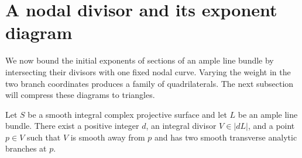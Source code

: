 \section{A nodal divisor and its exponent diagram}
\label{sec:node}

We now bound the initial exponents of sections of an ample line bundle by
intersecting their divisors with one fixed nodal curve.  Varying the weight
in the two branch coordinates produces a family of quadrilaterals.  The
next subsection will compress these diagrams to triangles.

\begin{lemma}
\label{lem:node}
Let $S$ be a smooth integral complex projective surface and let $L$ be an
ample line bundle.  There exist a positive integer $d$, an integral divisor
$V\in|dL|$, and a point $p\in V$ such that $V$ is smooth away from $p$ and
has two smooth transverse analytic branches at $p$.
\end{lemma}

